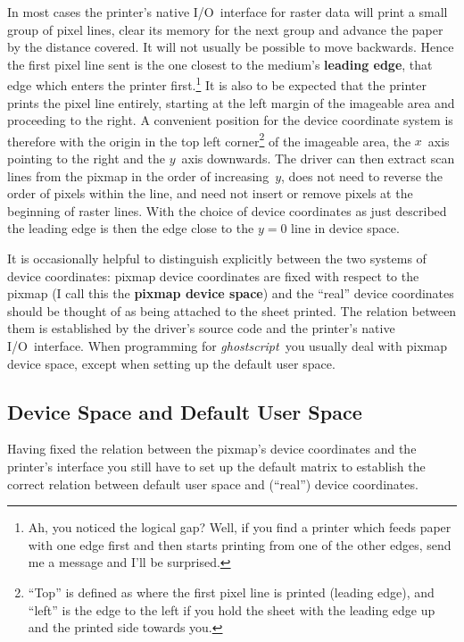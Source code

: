 \documentclass[twoside,a4paper]{article}
\newcommand{\gs}{\textit{ghostscript\/}}
\renewcommand{\d}[1]{{\bfseries #1}}	%
\begin{document}
In most cases the printer's native I/O~interface for raster data
will print a small group of pixel lines,
clear its memory for the next group
and advance the paper by the distance covered.
It will not usually be possible to move backwards.
Hence the first pixel line sent is the one closest to the medium's
\d{leading edge},
that edge which enters the printer first.\footnote{
  Ah, you noticed the logical gap?
  Well, if you find a printer which feeds paper with one edge first and
  then starts printing from one of the other edges,
  send me a message and I'll be surprised.}
It is also to be expected that the printer prints the pixel line entirely,
starting at the left margin of the imageable area and proceeding to the right.
A convenient position for the device coordinate system is therefore
with the origin in the top left corner\footnote{
  ``Top'' is defined as where the first pixel line is printed (leading edge),
  and ``left'' is the edge to the left if you hold the sheet with the
  leading edge up and the printed side towards you.}
of the imageable area,
the $x$~axis pointing to the right and the $y$~axis downwards.
The driver can then extract scan lines from the pixmap in the order of
increasing~$y$,
does not need to reverse the order of pixels within the line,
and need not insert or remove pixels at the beginning of raster lines.
With the choice of device coordinates as just described
the leading edge is then the edge close to the $y = 0$ line in device space.

It is occasionally helpful to distinguish explicitly between the two systems
of device coordinates:
pixmap device coordinates are fixed with respect to the pixmap
(I call this the \d{pixmap device space})
and the ``real'' device coordinates should be thought of as being attached to
the sheet printed.
The relation between them is established by the driver's source code and the
printer's native I/O~interface.
When programming for \gs\ you usually deal with pixmap device space,
except when setting up the default user space.


\subsection{Device Space and Default User Space}

Having fixed the relation between the pixmap's device coordinates and the
printer's interface you still have to set up the default matrix to establish
the correct relation between default user space and
(``real'') device coordinates.
\end{document}
